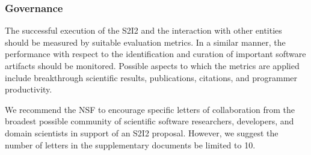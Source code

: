 \subsubsection{Governance}
The successful execution of the S2I2 and the interaction with other entities should be measured by suitable evaluation metrics. In a similar manner, the performance with respect to the identification and curation of important software artifacts should be monitored. Possible aspects to which the metrics are applied include breakthrough scientific results, publications, citations, and programmer productivity.

We recommend the NSF to encourage specific letters of collaboration from the broadest possible community of scientific software researchers, developers, and domain scientists in support of an S2I2 proposal. However, we suggest the number of letters in the supplementary documents be limited to 10.
